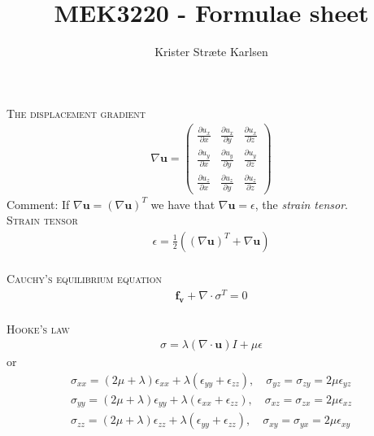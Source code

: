 \documentclass[11pt,a4paper,english]{article}
\title{MEK3220 - Formulae sheet}
\author{Krister Stræte Karlsen}
\begin{document}
\maketitle

{\scshape The displacement gradient} \\

\begin{align*}
\nabla \mathbf{u} = 
\begin{pmatrix}	    \frac{\partial u_x}{ \partial x} & \frac{\partial u_x}{ \partial y} & \frac{\partial u_x}{ \partial z}      \\
                		\frac{\partial u_y}{ \partial x} & \frac{\partial u_y}{ \partial y} & \frac{\partial u_y}{ \partial z}     \\
               	 	\frac{\partial u_z}{ \partial x} & \frac{\partial u_z}{ \partial y} &\frac{\partial u_z}{ \partial z}     
\end{pmatrix}
\end{align*}
\hspace{1cm} Comment: If $ \nabla \mathbf{u} =  ( \nabla \mathbf{u})^T  $ we have that $\nabla \mathbf{u} = \epsilon $, the \emph{strain tensor}.
\\[2ex] 

{\scshape Strain tensor} \\
\begin{align*}
\epsilon = \frac{1}{2}( (\nabla \mathbf{u} )^T + \nabla \mathbf{u}  ) 
\end{align*}
\\[2ex] 

{\scshape Cauchy's equilibrium equation} \\
\begin{align*}
\mathbf{f_v} + \nabla \cdot \sigma^T = 0
\end{align*}
\\[1ex]

{\scshape Hooke's law} \\
\begin{align*}
\sigma  = \lambda (\nabla \cdot \mathbf{u}) I + \mu \epsilon
\end{align*}
\hspace{1cm} or
\begin{align*}
\sigma_{xx} = (2\mu + \lambda) \epsilon_{xx} + \lambda (\epsilon_{yy} + \epsilon_{zz}), \quad \sigma_{yz} = \sigma_{zy} = 2 \mu \epsilon_{yz} \\
\sigma_{yy} = (2\mu + \lambda) \epsilon_{yy} + \lambda (\epsilon_{xx} + \epsilon_{zz}), \quad \sigma_{xz} = \sigma_{zx} = 2 \mu \epsilon_{xz}  \\
\sigma_{zz} = (2\mu + \lambda) \epsilon_{zz} + \lambda (\epsilon_{yy} + \epsilon_{zz}), \quad \sigma_{xy} = \sigma_{yx} = 2 \mu \epsilon_{xy} 
\end{align*}
\\[2ex]
\end{document}
